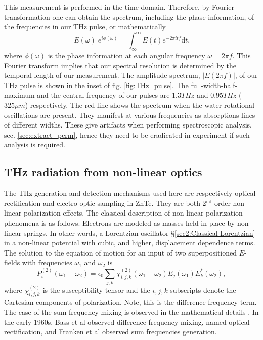 This measurement is performed in the time domain. Therefore, by Fourier transformation one can obtain the spectrum, including the phase information, of the frequencies in our THz pulse, or mathematically
\begin{equation}
|E(\omega)|e^{i\phi(\omega)} = \int_{\infty}^{\infty} E(t) e^{-2 \pi i t f} \text{d}t,
\label{eq:Fourier_T}
\end{equation}
where $\phi(\omega)$ is the phase information at each angular frequency $\omega =2 \pi f$. This Fourier transform implies that our spectral resolution is determined by the temporal length of our measurement. %
The amplitude spectrum, $|E(2 \pi f)|$, of our THz pulse is shown in the inset of fig. \ref{fig:THz_pulse}. The full-width-half-maximum and the central frequency of our pulses are $1.3THz$ and $0.95THz$ ($325\mu m$) respectively. The red line shows the spectrum when the water rotational oscillations are present. They manifest at various frequencies as absorptions lines of different widths. These give artifacts when performing spectroscopic analysis, sec. \ref{sec:extract_perm}, hence they need to be eradicated in experiment if such analysis is required. 


\subsection{THz radiation from non-linear optics} \label{sec:non_linear_optics}
The THz generation and detection mechanisms used here are respectively optical rectification and electro-optic sampling in ZnTe. They are both  2$^{\text{nd}}$ order non-linear polarization effects. The classical description of non-linear polarization phenomena is as follows. Electrons are modeled as masses held in place by non-linear springs. In other words, a Lorentzian oscillator \S \ref{sec2:Classical Lorentzian} in a non-linear potential with cubic, and higher, displacement dependence terms. The solution to the equation of motion for an input of two superpositioned $E$-fields with frequencies $\omega_1$ and $\omega_2$ is \cite{non-linearoptics} 
\begin{equation} 
P^{(2)}_i(\omega_1 - \omega_2)=\epsilon_0 \sum_{j,k}\chi_{i,j,k}^{(2)}(\omega_1-\omega_2) E_j(\omega_1)E_k^*(\omega_2),
\label{eq:Pnl and chi}
\end{equation}
where $\chi_{i,j,k}^{(2)}$ is the susceptibility tensor and the $i,j,k$ subscripts denote the Cartesian components of polarization. Note, this is the difference frequency term. The case of the sum frequency mixing is observed in the mathematical details \cite{non-linearoptics}. In the early 1960s, Bass et al \cite{Bass1962} observed difference frequency mixing, named optical rectification, and Franken et al \cite{Franken1961} observed sum frequencies generation.



